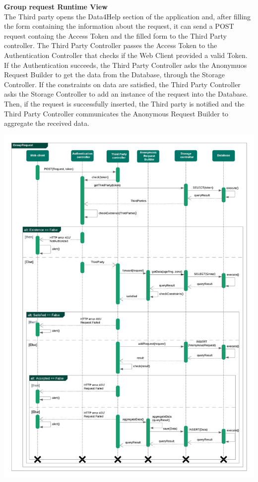 \begin{legal}
\begin{legal}
				\newpage
				\item \textbf{Group request Runtime View}\\
The Third party opens the Data4Help section of the application and, after filling the form containing the information about the request, it can send a POST request containg the Access Token and the filled form to the Third Party controller.
The Third Party Controller passes the Access Token to the Authentication Controller that checks if the Web Client provided a valid Token.
If the Authentication succeeds, the Third Party Controller asks the Anonymuos Request Builder to get the data from the Database, through the Storage Controller. If the constraints on data are satisfied, the Third Party Controller asks the Storage Controller to add an instance of the request into the Database. Then, if the request is successfully inserted, the Third party is notified and the Third Party Controller communicates the Anonymous Request Builder to aggregate the received data.
				\begin{center}
				\includegraphics[width=14cm]{images/seq_diagrams/groupRequestSeq.png}\\
				\end{center}
				

\end{legal}
\end{legal}
